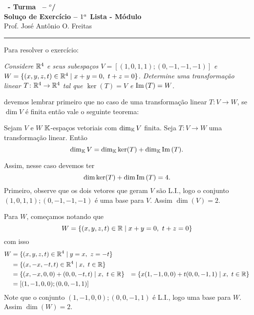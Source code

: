 \documentclass[12pt]{exam}
\begin{document}
    \begin{center}
        {\Large\bf \disciplina\ - Turma \turma\ -- \semestre$^{o}$/\ano} \\ \vspace{9pt} {\large\bf
            Soluço de Exercício -- $1^a$ Lista - Módulo \numeromodulo}\\ \vspace{9pt} Prof. José Antônio O. Freitas
    \end{center}
    \hrule

    Para resolver o exercício:
    \begin{center}
        \begin{flushleft}
            \textit{Considere $\mathbb{R}^4$ e seus subespaços $V = [(1,0,1,1);(0,-1,-1,-1)]$ e $W = \{(x,y,z,t) \in \mathbb{R}^4 \mid x + y = 0,\ t + z = 0\}$. Determine uma transformação linear $T \colon \mathbb{R}^4 \to \mathbb{R}^4$ tal que $\ker(T) = V$ e ${\rm Im\,}(T) = W$.}
         \end{flushleft}
    \end{center}
    devemos lembrar primeiro que no caso de uma transformação linear $T \colon V \to W$, se $\dim V$ é finita então vale o seguinte teorema:

    \begin{tcolorbox}[colback=green!30, colframe=green!80!blue, title=Teorema do Núcleo e da Imagem]
        Sejam $V$ e $W$ $\mathbb{K}$-espaços vetoriais com $\dim_{\mathbb{K}}V$ finita. Seja $T \colon V \to W$ uma transformação linear. Então
        \[
            \dim_{\mathbb{K}}V = \dim_{\mathbb{K}}\ker(T) + \dim_{\mathbb{K}}{\rm Im\,}(T).
        \]
    \end{tcolorbox}

    Assim, nesse caso devemos ter
    \[
        \dim\ker(T) + \dim{\rm Im\,}(T) = 4.
    \]
    Primeiro, observe que os dois vetores que geram $V$ são L.I., logo o conjunto ${(1, 0, 1, 1); (0,-1,-1,-1)}$ é uma base para $V$. Assim $\dim(V) = 2$.

    Para $W$, começamos notando que
    \[
        W = \{(x, y, z, t) \in \mathbb{R} \mid x + y = 0,\ t + z = 0\}
    \]
    com isso
    \begin{align*}
        W &= \{(x, y, z, t) \in \mathbb{R}^4 \mid y = x,\ z = -t\} \\ &= \{(x, -x, -t, t) \in \mathbb{R}^4 \mid x,\ t \in \mathbb{R}\} \\ &= \{(x, -x, 0, 0) + (0, 0, -t, t) \mid x,\ t \in \mathbb{R}\} &= \{x(1, -1, 0, 0) + t(0, 0, -1, 1) \mid x,\ t \in \mathbb{R}\} \\ &= [(1, -1, 0, 0); (0, 0, -1, 1)]
    \end{align*}
    Note que o conjunto ${(1, -1, 0, 0); (0, 0, -1, 1)}$ é L.I., logo uma base para $W$. Assim $\dim(W) = 2$.
\end{document}
